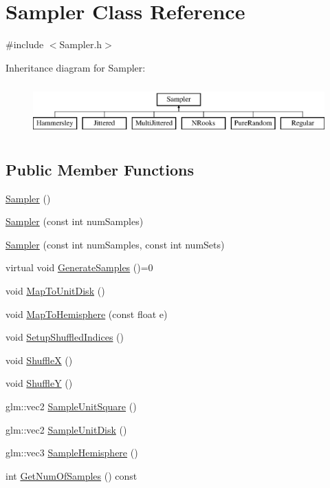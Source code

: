 \hypertarget{class_sampler}{}\section{Sampler Class Reference}
\label{class_sampler}


{\ttfamily \#include $<$Sampler.\+h$>$}

Inheritance diagram for Sampler\+:\begin{figure}[H]
\begin{center}
\leavevmode
\includegraphics[height=2.000000cm]{class_sampler}
\end{center}
\end{figure}
\subsection*{Public Member Functions}
\begin{DoxyCompactItemize}
\item 
\hyperlink{class_sampler_a9682037ac10546714cfde073143cb0be}{Sampler} ()
\item 
\hyperlink{class_sampler_a8dfadf2352d0c2518c73e54d0b00de39}{Sampler} (const int num\+Samples)
\item 
\hyperlink{class_sampler_ab3d3ec7bbf6be9d8199023d0ad2ec23b}{Sampler} (const int num\+Samples, const int num\+Sets)
\item 
virtual void \hyperlink{class_sampler_a3b75766bf339671a64a05ea9d25cd290}{Generate\+Samples} ()=0
\item 
void \hyperlink{class_sampler_ab6efd9686bab476dbdacbf7922711a45}{Map\+To\+Unit\+Disk} ()
\item 
void \hyperlink{class_sampler_aecad935bae132f108453f9ee5b3d6993}{Map\+To\+Hemisphere} (const float e)
\item 
void \hyperlink{class_sampler_a594169bdbb1673edbd53ec3937841df4}{Setup\+Shuffled\+Indices} ()
\item 
void \hyperlink{class_sampler_afc858c17a6f559d4178e37285eea8f25}{ShuffleX} ()
\item 
void \hyperlink{class_sampler_a685b224ed1cc1a70a0ca602f7b2f6384}{ShuffleY} ()
\item 
glm\+::vec2 \hyperlink{class_sampler_a59fb62883540848f95e3b7655cf18cf6}{Sample\+Unit\+Square} ()
\item 
glm\+::vec2 \hyperlink{class_sampler_aea3eabc2048e29fe920c49aa35957cd5}{Sample\+Unit\+Disk} ()
\item 
glm\+::vec3 \hyperlink{class_sampler_a811c4a50a8767189491e6a5ab7d30cf9}{Sample\+Hemisphere} ()
\item 
int \hyperlink{group___samplers_ga3d438d62d7b7eaec05cff684f96cfe02}{Get\+Num\+Of\+Samples} () const
\end{DoxyCompactItemize}
